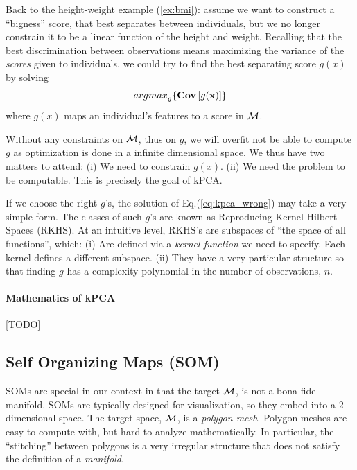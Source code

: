 \documentclass[12pt,a4paper]{article}
\begin{document}
Back to the height-weight example (\ref{ex:bmi}): assume we want to construct a ``bigness'' score, that best separates between individuals, but we no longer constrain it to be a linear function of the height and weight.
Recalling that the best discrimination between observations means maximizing the variance of the \emph{scores} given to individuals, we could try to find the best separating score $g(x)$ by solving 
\begin{align}
\label{eq:kpca_wrong}
	\textstyle{\mathop{argmax}_{g}}\{ \mathbf{Cov} \left[ g(\mathbf{x}) \right] \}
\end{align}
where $g(x)$ maps an individual's features to a score in $\mathcal{M}$.

Without any constraints on $\mathcal{M}$, thus on $g$, we will overfit \andor not be able to compute $g$ as optimization is done in a infinite dimensional space. 
We thus have two matters to attend:
(i) We need to constrain $g(x)$.
(ii) We need the problem to be computable.
This is precisely the goal of kPCA. 

If we choose the right $g$'s, the solution of Eq.(\ref{eq:kpca_wrong}) may take a very simple form. 
The classes of such $g$'s are known as Reproducing Kernel Hilbert Spaces (RKHS). 
At an intuitive level, RKHS's are subspaces of ``the space of all functions'', which:
(i) Are defined via a \emph{kernel function} we need to specify. Each kernel defines a different subspace. 
(ii) They have a very particular structure so that finding $g$ has a complexity polynomial in the number of observations, $n$. 



\paragraph{Mathematics of kPCA}
[TODO]




\subsection{Self Organizing Maps (SOM)}
SOMs are special in our context in that the target $\mathcal{M}$, is not a bona-fide manifold. 
SOMs are typically designed for visualization, so they embed into a $2$ dimensional space. 
The target space, $\mathcal{M}$, is a \emph{polygon mesh}.
Polygon meshes are easy to compute with, but hard to analyze mathematically. 
In particular, the ``stitching'' between polygons is a very irregular structure that does not satisfy the definition of a \emph{manifold}.
\end{document}
